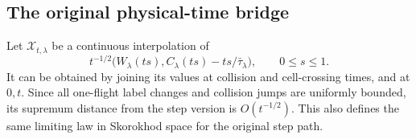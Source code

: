 \subsection{The original physical-time bridge}
Let $\mathcal X_{t,\lambda}$ be a continuous interpolation of
\begin{equation}\label{eq:v36-physical-path}
 t^{-1/2}\bigl(W_\lambda(ts),C_\lambda(ts)-ts/\bar\tau_\lambda\bigr),
                         \qquad 0\le s\le1.
\end{equation}
It can be obtained by joining its values at collision and cell-crossing
times, and at $0,t$. Since all one-flight label changes and collision
jumps are uniformly bounded, its supremum distance from the step
version is $O(t^{-1/2})$. This also defines the same limiting law in
Skorokhod space for the original step path.

